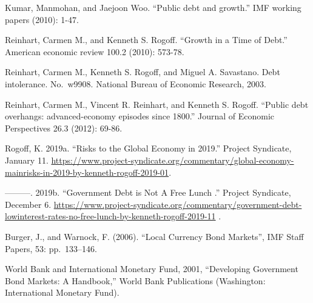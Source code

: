 \documentclass[
]{article}
\begin{document}
Kumar, Manmohan, and Jaejoon Woo. ``Public debt and growth.'' IMF
working papers (2010): 1-47.

Reinhart, Carmen M., and Kenneth S. Rogoff. ``Growth in a Time of
Debt.'' American economic review 100.2 (2010): 573-78.

Reinhart, Carmen M., Kenneth S. Rogoff, and Miguel A. Savastano. Debt
intolerance. No.~w9908. National Bureau of Economic Research, 2003.

Reinhart, Carmen M., Vincent R. Reinhart, and Kenneth S. Rogoff.
``Public debt overhangs: advanced-economy episodes since 1800.'' Journal
of Economic Perspectives 26.3 (2012): 69-86.

Rogoff, K. 2019a. ``Risks to the Global Economy in 2019.'' Project
Syndicate, January 11.
\url{https://www.project-syndicate.org/commentary/global-economy-mainrisks-in-2019-by-kenneth-rogoff-2019-01}.

---------. 2019b. ``Government Debt is Not A Free Lunch .'' Project
Syndicate, December 6.
\url{https://www.project-syndicate.org/commentary/government-debt-lowinterest-rates-no-free-lunch-by-kenneth-rogoff-2019-11}
.

Burger, J., and Warnock, F. (2006). ``Local Currency Bond Markets'', IMF
Staff Papers, 53: pp.~133--146.

World Bank and International Monetary Fund, 2001, ``Developing
Government Bond Markets: A Handbook,'' World Bank Publications
(Washington: International Monetary Fund).
\end{document}
